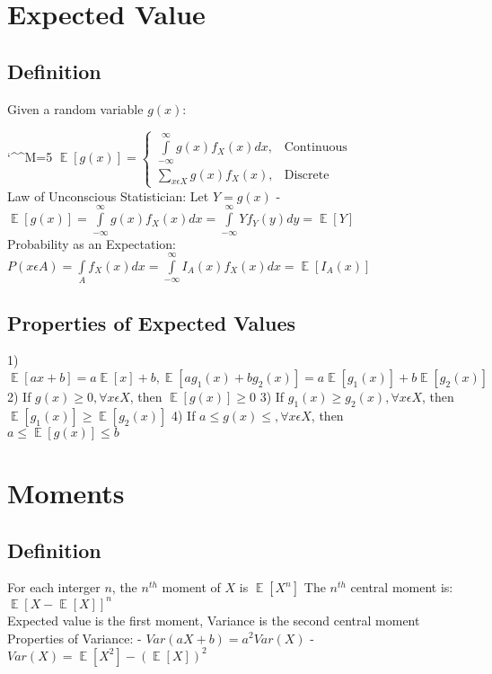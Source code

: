\documentclass[twocolumn]{article}
\def\disobeylines{\catcode`\^^M=5 } %
\DeclareMathOperator{\EX}{\mathbb{E}} %
\let\Oldint=\int
\let\Oldsum=\sum
\renewcommand{\int}{\Oldint\limits}
\renewcommand{\sum}{\Oldsum\limits}
\newcommand{\infint}{\int_{-\infty}^{\infty}} %
\begin{document}
\section*{Expected Value}
\subsection*{Definition}
Given a random variable $g(x)$:

\disobeylines
\begin{math}
  \EX[g(x)]=\left\{
    \begin{array}{ll}
      \infint g(x) f_X(x) dx, & \text{Continuous}\\
      \sum_{x \epsilon X} g(x) f_X(x),         & \text{Discrete}
    \end{array}
  \right.
\end{math}
\obeylines\\

Law of Unconscious Statistician: Let $Y = g(x)$
- $\EX[g(x)] = \infint g(x) f_X(x) dx = \infint Y f_Y(y) dy = \EX[Y]$\\

Probability as an Expectation:
$P(x \epsilon A) = \int_A f_X(x) dx = \infint I_A(x)f_X(x) dx = \EX[I_A(x)]$

\subsection*{Properties of Expected Values}
1) $\EX[ax + b] = a\EX[x] + b, \EX[a g_1(x) + b g_2(x)] = a\EX[g_1(x)] + b\EX[g_2(x)]$
2) If $g(x) \ge 0, \forall x \epsilon X$, then $\EX[g(x)] \ge 0$
3) If $g_1(x) \ge g_2(x), \forall x \epsilon X$, then $\EX[g_1(x)] \ge \EX[g_2(x)]$
4) If $a \le g(x) \le, \forall x \epsilon X$, then $a \le \EX[g(x)] \le b$

\section*{Moments}
\subsection*{Definition}
For each interger $n$, the $n^{th}$ moment of $X$ is $\EX[X^n]$
The $n^{th}$ central moment is: $\EX[X - \EX[X]]^n$\\

Expected value is the first moment, Variance is the second central moment\\

Properties of Variance:
- $Var(aX + b) = a^2 Var(X)$
- $Var(X) = \EX[X^2] - (\EX[X])^2$
\end{document}
